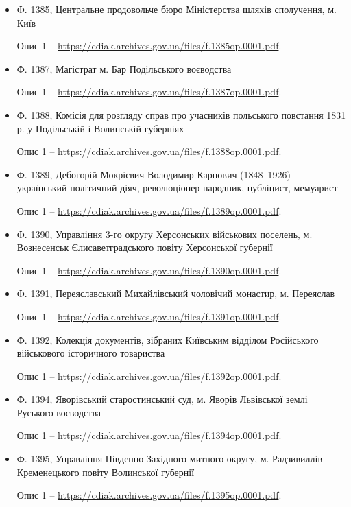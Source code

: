 \begin{itemize} %

\item Ф. 1385, Центральне продовольче бюро Міністерства шляхів сполучення, м. Київ\par
   Опис 1 – \url{https://cdiak.archives.gov.ua/files/f.1385op.0001.pdf}.

\item Ф. 1387, Магістрат м. Бар Подільського воєводства\par
   Опис 1 – \url{https://cdiak.archives.gov.ua/files/f.1387op.0001.pdf}.

\item Ф. 1388, Комісія для розгляду справ про учасників польського повстання 1831 р. у Подільській і Волинській губерніях\par
   Опис 1 – \url{https://cdiak.archives.gov.ua/files/f.1388op.0001.pdf}.

\item Ф. 1389, Дебогорій-Мокрієвич Володимир Карпович (1848–1926) – український політичний діяч, революціонер-народник, публіцист, мемуарист\par
   Опис 1 – \url{https://cdiak.archives.gov.ua/files/f.1389op.0001.pdf}.

\item Ф. 1390, Управління 3-го округу Херсонських військових поселень, м. Вознесенськ Єлисаветградського повіту Херсонської губернії\par
   Опис 1 – \url{https://cdiak.archives.gov.ua/files/f.1390op.0001.pdf}.

\item Ф. 1391, Переяславський Михайлівський чоловічий монастир, м. Переяслав\par
   Опис 1 – \url{https://cdiak.archives.gov.ua/files/f.1391op.0001.pdf}.

\item Ф. 1392, Колекція документів, зібраних Київським відділом Російського військового історичного товариства\par
   Опис 1 – \url{https://cdiak.archives.gov.ua/files/f.1392op.0001.pdf}.

\item Ф. 1394, Яворівський старостинський суд, м. Яворів Львівської землі Руського воєводства\par
   Опис 1 – \url{https://cdiak.archives.gov.ua/files/f.1394op.0001.pdf}.

\item Ф. 1395, Управління Південно-Західного митного округу, м. Радзивиллів Кременецького повіту Волинської губернії\par
   Опис 1 – \url{https://cdiak.archives.gov.ua/files/f.1395op.0001.pdf}.


\end{itemize}

